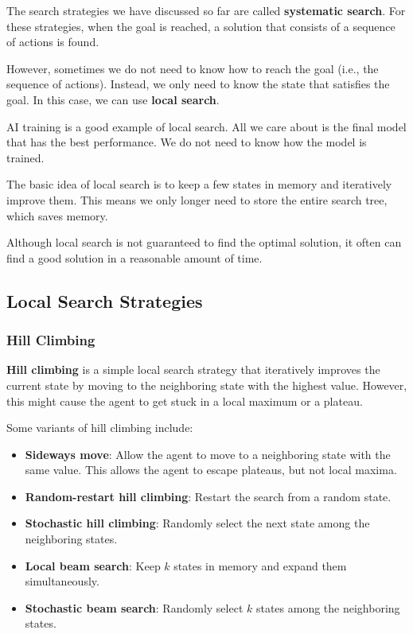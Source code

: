 \documentclass[a4paper,12pt]{article}
\begin{document}
The search strategies we have discussed so far are called \textbf{systematic search}. For these strategies, when the goal is reached, a solution that consists of a sequence of actions is found. 

However, sometimes we do not need to know how to reach the goal (i.e., the sequence of actions). Instead, we only need to know the state that satisfies the goal. In this case, we can use \textbf{local search}.

\begin{examplebox}
  AI training is a good example of local search. All we care about is the final model that has the best performance. We do not need to know how the model is trained.
\end{examplebox}

The basic idea of local search is to keep a few states in memory and iteratively improve them. This means we only longer need to store the entire search tree, which saves memory.

Although local search is not guaranteed to find the optimal solution, it often can find a good solution in a reasonable amount of time.

\subsection{Local Search Strategies}

\subsubsection{Hill Climbing}

\textbf{Hill climbing} is a simple local search strategy that iteratively improves the current state by moving to the neighboring state with the highest value. However, this might cause the agent to get stuck in a local maximum or a plateau.

Some variants of hill climbing include:
\begin{itemize}
  \item \textbf{Sideways move}: Allow the agent to move to a neighboring state with the same value. This allows the agent to escape plateaus, but not local maxima.
  \item \textbf{Random-restart hill climbing}: Restart the search from a random state.
  \item \textbf{Stochastic hill climbing}: Randomly select the next state among the neighboring states.
  \item \textbf{Local beam search}: Keep $k$ states in memory and expand them simultaneously.
  \item \textbf{Stochastic beam search}: Randomly select $k$ states among the neighboring states.
\end{itemize}
\end{document}
